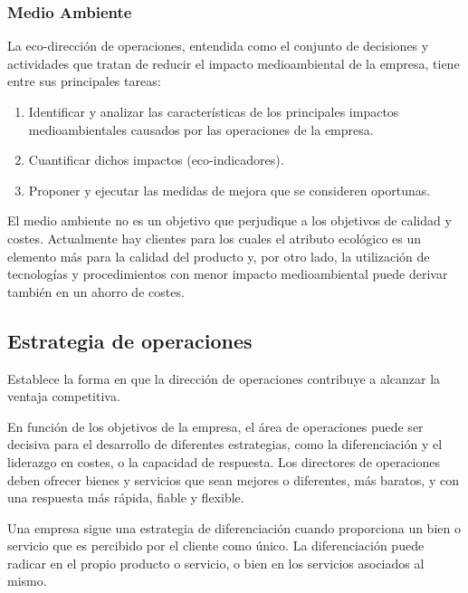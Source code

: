 \documentclass[10pt,a4paper,spanish]{report}
\begin{document}
                  \subsubsection{\textcolor[rgb]{0.9,0.7,0.6}Medio Ambiente}

                        La eco-dirección de operaciones, entendida como el conjunto de decisiones y actividades que tratan de reducir el impacto medioambiental de la empresa, tiene entre sus principales tareas:

                        \begin{enumerate}
                              \item Identificar y analizar las características de los principales impactos medioambientales causados por las operaciones de la empresa.
                              \item Cuantificar dichos impactos (eco-indicadores).
                              \item Proponer y ejecutar las medidas de mejora que se consideren oportunas.
                        \end{enumerate}

                        El medio ambiente no es un objetivo que perjudique a los objetivos de calidad y costes. Actualmente hay clientes para los cuales el atributo ecológico es un elemento más para la calidad del producto y, por otro lado, la utilización de tecnologías y procedimientos con menor impacto medioambiental puede derivar también en un ahorro de costes.

            \subsection{\textcolor[rgb]{0.9,0.7,0.6}Estrategia de operaciones}

                  Establece la forma en que la dirección de operaciones contribuye a alcanzar la ventaja competitiva.

                  En función de los objetivos de la empresa, el área de operaciones puede ser decisiva para el desarrollo de diferentes estrategias, como la diferenciación y el liderazgo en costes, o la capacidad de respuesta. Los directores de operaciones deben ofrecer bienes y servicios que sean mejores o diferentes, más baratos, y con una respuesta más rápida, fiable y flexible.

                  Una empresa sigue una estrategia de diferenciación cuando proporciona un bien o servicio que es percibido por el cliente como único. La diferenciación puede radicar en el propio producto o servicio, o bien en los servicios asociados al mismo.
\end{document}
